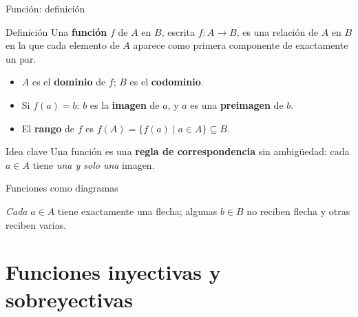 \documentclass[10pt,xcolor=dvipsnames]{beamer}
\begin{document}
\begin{frame}{Función: definición}
  \begin{block}{Definición}
    Una \textbf{función} $f$ de $A$ en $B$, escrita $f : A \to B$, es una
    relación de $A$ en $B$ en la que \alert{cada elemento de $A$ aparece
    como primera componente de exactamente un par}.
  \end{block}

  \begin{itemize}
    \item $A$ es el \textbf{dominio} de $f$; $B$ es el \textbf{codominio}.
    \item Si $f(a) = b$: $b$ es la \textbf{imagen} de $a$, y $a$ es una
          \textbf{preimagen} de $b$.
    \item El \textbf{rango} de $f$ es
          $f(A) = \{f(a) \mid a \in A\} \subseteq B$.
  \end{itemize}

  \begin{alertblock}{Idea clave}
    Una función es una \textbf{regla de correspondencia} sin ambigüedad:
    cada $a \in A$ tiene \emph{una y solo una} imagen.
  \end{alertblock}
\end{frame}

\begin{frame}{Funciones como diagramas}
  \begin{center}
  \end{center}
  \emph{Cada} $a \in A$ tiene exactamente una flecha; algunas $b \in B$ no
  reciben flecha y otras reciben varias.
\end{frame}





\section{Funciones inyectivas y sobreyectivas}
\end{document}
